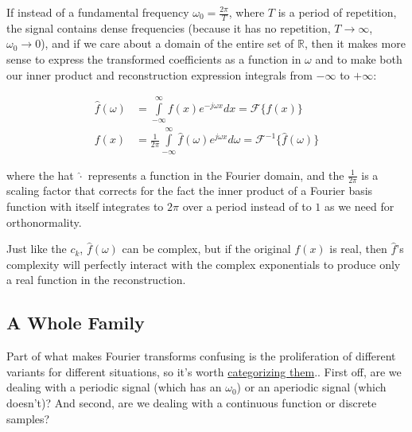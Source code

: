 \documentclass[10pt]{article}
\begin{document}
If instead of a fundamental frequency $\omega_0 = \frac{2\pi}{T}$, where $T$ is a period of repetition, the signal contains dense frequencies (because it has no repetition, $T \rightarrow \infty$, $\omega_0 \rightarrow 0$), and if we care about a domain of the entire set of $\mathbb{R}$, then it makes more sense to express the transformed coefficients as a function in $\omega$ and to make both our inner product and reconstruction expression integrals from $-\infty$ to $+\infty$:


\begin{equation}\label{pair}
\begin{aligned}
\hat{f}(\omega) &= \int\limits_{-\infty}^{\infty} f(x) e^{-j \omega x} dx = \mathcal{F}\{f(x)\} \\
f(x) &= \frac{1}{2\pi} \int\limits_{-\infty}^{\infty} \hat{f}(\omega) e^{j \omega x} d \omega = \mathcal{F}^{-1}\{\hat{f}(\omega)\}
\end{aligned}
\end{equation}


where the hat $\hat{\cdot}$ represents a function in the Fourier domain, and the $\frac{1}{2\pi}$ is a scaling factor that corrects for the fact the inner product of a Fourier basis function with itself integrates to $2\pi$ over a period instead of to $1$ as we need for orthonormality.

Just like the $c_k$, $\hat{f}(\omega)$ can be complex, but if the original $f(x)$ is real, then $\hat{f}$'s complexity will perfectly interact with the complex exponentials to produce only a real function in the reconstruction. 

\subsection{A Whole Family}\label{family}

Part of what makes Fourier transforms confusing is the proliferation of different variants for different situations, so it's worth \href{https://medium.com/sho-jp/fourier-transform-101-part-4-discrete-fourier-transform-8fc3fbb763f3 }{categorizing them}.\cite{medium}. First off, are we dealing with a periodic signal (which has an $\omega_0$) or an aperiodic signal (which doesn't)? And second, are we dealing with a continuous function or discrete samples?
\end{document}
